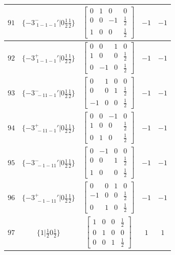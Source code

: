 \documentclass[fleqn,8pt]{jsarticle}
\begin{document}
\begin{longtable}{ccccc}
$ 91 $ & $ \{-3^{-}_{\,\,1-1-1}{}'|0 \frac{1}{2} \frac{1}{2}\} $ & $ \begin{bmatrix} 0 & 1 & 0 & 0 \\ 0 & 0 & -1 & \frac{1}{2} \\ 1 & 0 & 0 & \frac{1}{2} \end{bmatrix} $ & $ -1 $ & $ -1 $ \\ \hline
$ 92 $ & $ \{-3^{+}_{\,\,1-1-1}{}'|0 \frac{1}{2} \frac{1}{2}\} $ & $ \begin{bmatrix} 0 & 0 & 1 & 0 \\ 1 & 0 & 0 & \frac{1}{2} \\ 0 & -1 & 0 & \frac{1}{2} \end{bmatrix} $ & $ -1 $ & $ -1 $ \\ \hline
$ 93 $ & $ \{-3^{-}_{\,\,-11-1}{}'|0 \frac{1}{2} \frac{1}{2}\} $ & $ \begin{bmatrix} 0 & 1 & 0 & 0 \\ 0 & 0 & 1 & \frac{1}{2} \\ -1 & 0 & 0 & \frac{1}{2} \end{bmatrix} $ & $ -1 $ & $ -1 $ \\ \hline
$ 94 $ & $ \{-3^{+}_{\,\,-11-1}{}'|0 \frac{1}{2} \frac{1}{2}\} $ & $ \begin{bmatrix} 0 & 0 & -1 & 0 \\ 1 & 0 & 0 & \frac{1}{2} \\ 0 & 1 & 0 & \frac{1}{2} \end{bmatrix} $ & $ -1 $ & $ -1 $ \\ \hline
$ 95 $ & $ \{-3^{-}_{\,\,-1-11}{}'|0 \frac{1}{2} \frac{1}{2}\} $ & $ \begin{bmatrix} 0 & -1 & 0 & 0 \\ 0 & 0 & 1 & \frac{1}{2} \\ 1 & 0 & 0 & \frac{1}{2} \end{bmatrix} $ & $ -1 $ & $ -1 $ \\ \hline
$ 96 $ & $ \{-3^{+}_{\,\,-1-11}{}'|0 \frac{1}{2} \frac{1}{2}\} $ & $ \begin{bmatrix} 0 & 0 & 1 & 0 \\ -1 & 0 & 0 & \frac{1}{2} \\ 0 & 1 & 0 & \frac{1}{2} \end{bmatrix} $ & $ -1 $ & $ -1 $ \\ \hline
$ 97 $ & $ \{1|\frac{1}{2} 0 \frac{1}{2}\} $ & $ \begin{bmatrix} 1 & 0 & 0 & \frac{1}{2} \\ 0 & 1 & 0 & 0 \\ 0 & 0 & 1 & \frac{1}{2} \end{bmatrix} $ & $ 1 $ & $ 1 $ \\ \hline

\end{longtable}
\end{document}
